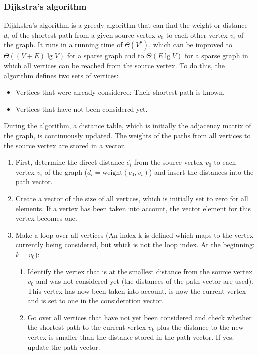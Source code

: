 \subsubsection{Dijkstra's algorithm}

Dijkkstra's algorithm is a greedy algorithm that can find the weight or distance $d_i$ of the shortest path from a given source vertex 
$v_0$ to each other vertex $v_i$ of the graph. It runs in a running time of $\Theta(V^2)$, which can be improved to $\Theta((V+E)\lg V)$ for a sparse graph and to $\Theta(E\lg V)$ for a sparse graph in which all vertices can be reached from the source vertex. To do this, the algorithm defines two sets of vertices:

\begin{itemize}
    \item Vertices that were already considered: Their shortest path is known.
    \item Vertices that have not been considered yet. 
\end{itemize}

During the algorithm, a distance table, which is initially the adjacency matrix of the graph, is continuously updated. The weights of the paths from all vertices to the source vertex are stored in a vector.

\begin{enumerate}
    \item First, determine the direct distance $d_i$ from the source vertex $v_0$ to each vertex $v_i$ of the graph ($d_i=\mathrm{weight}(v_0,v_i)$) and insert the distances into the path vector.
    \item Create a vector of the size of all vertices, which is initially set to zero for all elements. If a vertex has been taken into account, the vector element for this vertex becomes one. 
    \item Make a loop over all vertices (An index k is defined which maps to the vertex currently being considered, but which is not the loop index. At the beginning: $k=v_0$):
    \begin{enumerate}
        \item Identify the vertex that is at the smallest distance from the source vertex $v_0$ and was not considered yet (the distances of the path vector are used). This vertex has now been taken into account, is now the current vertex and is set to one in the consideration vector.
        \item Go over all vertices that have not yet been considered and check whether the shortest path to the current vertex $v_k$ plus the distance to the new vertex is smaller than the distance stored in the path vector. If yes. update the path vector.
    \end{enumerate}
\end{enumerate}


